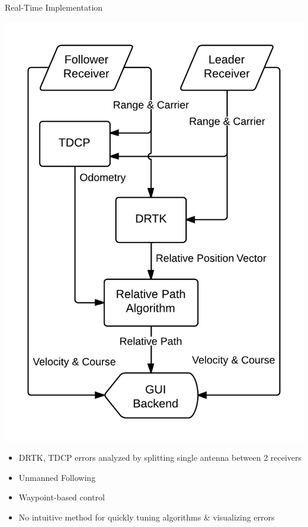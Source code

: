 \documentclass{beamer}
\begin{document}
  \begin{frame}{Real-Time Implementation}
    \begin{minipage}{0.45\textwidth}
      \centering
      \includegraphics[width=\textwidth]{../graphics/data_algo.png}
    \end{minipage}
    \begin{minipage}{0.45\textwidth}
      \begin{itemize} \small
        \item DRTK, TDCP errors analyzed by splitting single antenna between 2 receivers
        \item Unmanned Following
        \item Waypoint-based control
        \item No intuitive method for quickly tuning algorithms \& visualizing errors
      \end{itemize}
    \end{minipage}
  \end{frame}
\end{document}
